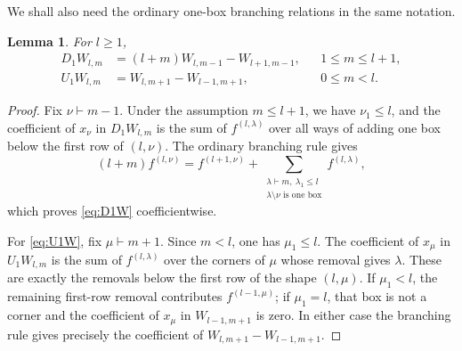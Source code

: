 \documentclass[a4paper,draft]{amsart}
\newtheorem{lemma}{Lemma}
\begin{document}
We shall also need the ordinary one-box branching relations in the
same notation.

\begin{lemma}\label{lem:D1U1}
For $l\geq1$,
\begin{align}
D_1W_{l,m}&=(l+m)W_{l,m-1}-W_{l+1,m-1},
&&1\leq m\leq l+1, \label{eq:D1W}\\
U_1W_{l,m}&=W_{l,m+1}-W_{l-1,m+1},
&&0\leq m<l. \label{eq:U1W}
\end{align}
\end{lemma}

\begin{proof}
Fix $\nu\vdash m-1$.  Under the assumption $m\leq l+1$, we have
$\nu_1\leq l$, and the coefficient of $x_\nu$ in $D_1W_{l,m}$ is the
sum of $f^{(l,\lambda)}$ over all ways of adding one box below the
first row of $(l,\nu)$.  The ordinary branching rule gives
\[
(l+m)f^{(l,\nu)}
=f^{(l+1,\nu)}+
\sum_{\substack{\lambda\vdash m,\ \lambda_1\leq l\\\lambda\setminus\nu
\text{ is one box}}}f^{(l,\lambda)},
\]
which proves \eqref{eq:D1W} coefficientwise.

For \eqref{eq:U1W}, fix $\mu\vdash m+1$.  Since $m<l$, one has
$\mu_1\leq l$.  The coefficient of $x_\mu$ in $U_1W_{l,m}$ is the
sum of $f^{(l,\lambda)}$ over the corners of $\mu$ whose removal gives
$\lambda$.  These are exactly the removals below the first row of the
shape $(l,\mu)$.  If $\mu_1<l$, the remaining first-row removal
contributes $f^{(l-1,\mu)}$; if $\mu_1=l$, that box is not a corner
and the coefficient of $x_\mu$ in $W_{l-1,m+1}$ is zero.  In either
case the branching rule gives precisely the coefficient of
$W_{l,m+1}-W_{l-1,m+1}$.
\end{proof}
\end{document}
